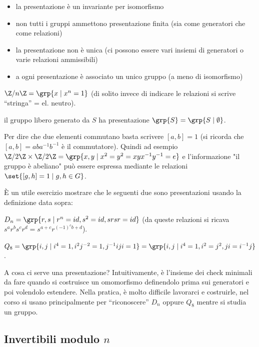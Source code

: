 \begin{itemize}
    \item la presentazione è un invariante per isomorfismo
    \item non tutti i gruppi ammettono presentazione finita (sia come generatori che come relazioni)
    \item la presentazione non è unica (ci possono essere vari insiemi di generatori o varie relazioni ammissibili)
    \item a ogni presentazione è associato un unico gruppo (a meno di isomorfismo)
    \end{itemize}
\begin{example}
    $\Z/n\Z = \grp{x \mid x^n = 1}$ (di solito invece di indicare le relazioni si scrive ``stringa'' = el. neutro).
\end{example}
\begin{example}
    il gruppo libero generato da $S$ ha presentazione $\grp{S} = \grp{S \mid \emptyset}$.
\end{example}
\begin{example}
    Per dire che due elementi commutano basta scrivere $[a,b] = 1$ (si ricorda che $[a,b] = aba^{-1}b^{-1}$ è il commutatore). Quindi ad esempio $\Z/2\Z \times \Z/2\Z = \grp{x,y \mid x^2 = y^2 = xyx^{-1}y^{-1} = e}$ e l'informazione "il gruppo è abeliano" può essere espressa mediante le relazioni $\set{[g,h] = 1 \mid g,h \in G}$.
\end{example}
È un utile esercizio mostrare che le seguenti due sono presentazioni usando la definizione data sopra:
\begin{example}
    $D_n = \grp{ r, s \mid r^n = id, s^2 = id, srsr = id }$ (da queste relazioni si ricava $s^ar^bs^cr^d = s^{a+c}r^{(-1)^cb+d}$).
\end{example}
\begin{example}
    $Q_8 = \grp{i,j \mid i^4 = 1, i^2j^{-2} = 1, j^{-1}iji = 1} = \grp{i,j \mid i^4 = 1, i^2 = j^2, ji = i^{-1}j}$.
\end{example}
A cosa ci serve una presentazione? Intuitivamente, è l'insieme dei check minimali da fare quando si costruisce un omomorfismo definendolo prima sui generatori e poi volendolo estendere. Nella pratica, è molto difficile lavorarci e costruirle, nel corso si usano principalmente per ``riconoscere'' $D_n$ oppure $Q_8$ mentre si studia un gruppo. 


\subsection{Invertibili modulo $n$}

